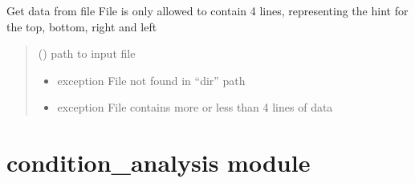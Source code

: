 \documentclass[letterpaper,10pt,english]{sphinxmanual}
\begin{document}
\begin{fulllineitems}

\begin{fulllineitems}
\label{\detokenize{hints:hints.HintsData.getData}}
\pysigstartsignatures
{}
\pysigstopsignatures
\sphinxAtStartPar
Get data from file
File is only allowed to contain 4 lines,
representing the hint for the top, bottom, right and left
\begin{quote}\begin{description}
\sphinxAtStartPar
{} () \textendash{} path to input file

\begin{itemize}
\item {} 
\sphinxAtStartPar
{} \textendash{} exception \sphinxhyphen{} File not found in “dir” path

\item {} 
\sphinxAtStartPar
{} \textendash{} exception \sphinxhyphen{} File contains more or less             than 4 lines of data

\end{itemize}

\end{description}\end{quote}

\end{fulllineitems}


\end{fulllineitems}


\sphinxstepscope


\section{condition\_analysis module}
\label{\detokenize{condition_analysis:module-condition_analysis}}\label{\detokenize{condition_analysis:condition-analysis-module}}\label{\detokenize{condition_analysis::doc}}
\end{document}
